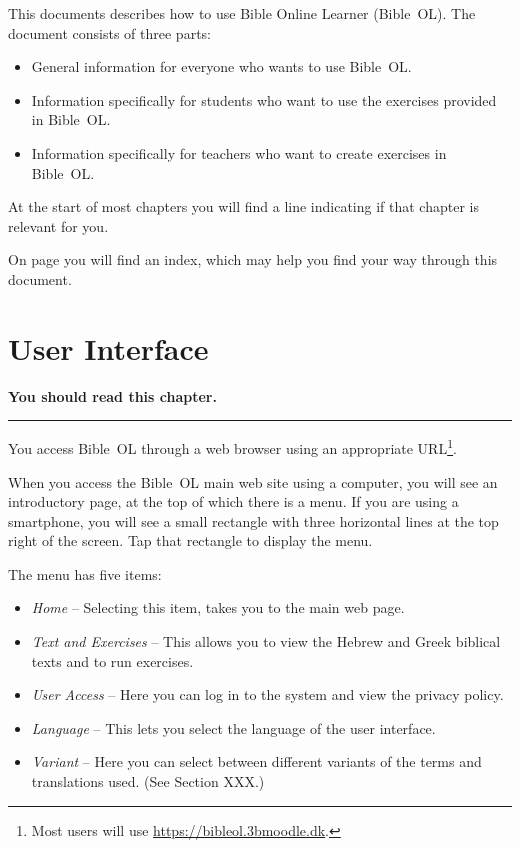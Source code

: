 \documentclass[11pt,oneside,a4paper]{memoir}
\begin{document}
This documents describes how to use Bible Online Learner (Bible~OL). The document consists of three
parts:

\begin{itemize}
\item General information for everyone who wants to use Bible~OL.
\item Information specifically for students who want to use the exercises provided in Bible~OL.
\item Information specifically for teachers who want to create exercises in Bible~OL.
\end{itemize}

At the start of most chapters you will find a line indicating if that chapter is relevant for you.

On page \pageref{sec-index} you will find an index, which may help you find your way through this document.

\chapter{User Interface}

\textbf{You should read this chapter.}
\plainbreak{3}

You access Bible~OL through a web browser using an appropriate
URL\footnote{Most users will use \url{https://bibleol.3bmoodle.dk}.}.

When you access the Bible~OL main web site using a computer, you will see an introductory page,
at the top of which there is a menu. If you are using a smartphone, you will see a small rectangle with
three horizontal lines at the top right of the screen. Tap that rectangle to display the menu.


The menu has five items:

\begin{itemize}
\item \emph{Home} -- Selecting this item, takes you to the main web page.
\item \emph{Text and Exercises} -- This allows you to view the Hebrew and Greek biblical texts and to run exercises.
\item \emph{User Access} -- Here you can log in to the system and view the privacy policy.
\item \emph{Language} -- This lets you select the language of the user interface.
\item \emph{Variant} -- Here you can select between different variants of the terms and translations used. (See Section XXX.)
\end{itemize}
\end{document}

